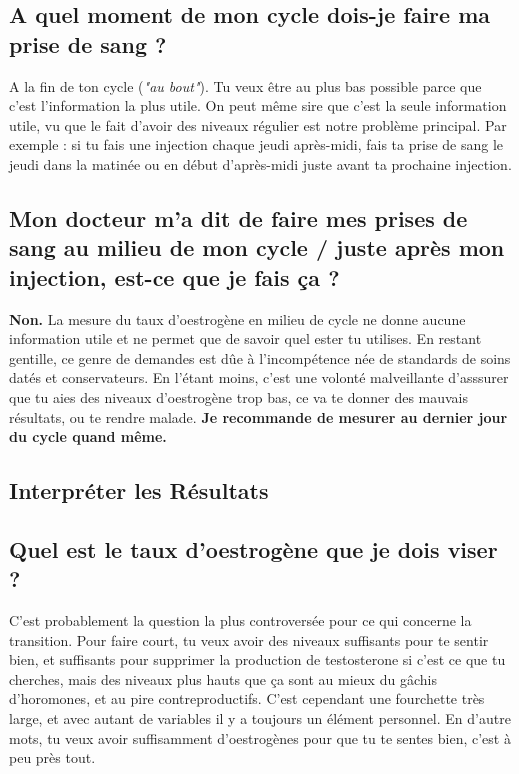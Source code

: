 \documentclass{article}
\begin{document}
\subsection{A quel moment de mon cycle dois-je faire ma prise de sang ?}

A la fin de ton cycle (\textit{"au bout"}). Tu veux être au plus bas possible parce que c'est l'information la plus utile. On peut même sire que c'est la seule information utile, vu que le fait d'avoir des niveaux régulier est notre problème principal. Par exemple : si tu fais une injection chaque jeudi après-midi, fais ta prise de sang le jeudi dans la matinée ou en début d'après-midi juste avant ta prochaine injection.

\subsection{Mon docteur m'a dit de faire mes prises de sang au milieu de mon cycle / juste après mon injection, est-ce que je fais ça ?}

\textbf{Non.} La mesure du taux d'oestrogène en milieu de cycle ne donne aucune information utile et ne permet que de savoir quel ester tu utilises. En restant gentille, ce genre de demandes est dûe à l'incompétence née de standards de soins datés et conservateurs. En l'étant moins, c'est une volonté malveillante d'asssurer que tu aies des niveaux d'oestrogène trop bas, ce va te donner des mauvais résultats, ou te rendre malade. \textbf{Je recommande de mesurer au dernier jour du cycle quand même.} 

\subsection*{Interpréter les Résultats}

\subsection{Quel est le taux d'oestrogène que je dois viser ?}

C'est probablement la question la plus controversée pour ce qui concerne la transition. Pour faire court, tu veux avoir des niveaux suffisants pour te sentir bien, et suffisants pour supprimer la production de testosterone si c'est ce que tu cherches, mais des niveaux plus hauts que ça sont au mieux du gâchis d'horomones, et au pire contreproductifs. C'est cependant une fourchette très large, et avec autant de variables il y a toujours un élément personnel. En d'autre mots, tu veux avoir suffisamment d'oestrogènes pour que tu te sentes bien, c'est à peu près tout.
\end{document}
